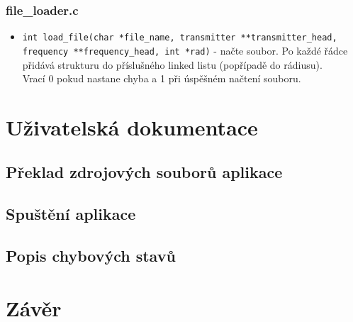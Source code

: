 \documentclass[12pt]{article}
\begin{document}
\subsubsection{file\_loader.c}
\begin{itemize}
	\item \texttt{int load\_file(char *file\_name,
		transmitter **transmitter\_head,
              frequency **frequency\_head, int *rad)} - načte soubor. Po každé
		řádce přidává strukturu do příslušného linked listu (popřípadě
		do rádiusu).\\

		Vrací 0 pokud nastane chyba a 1 při úspěšném načtení souboru.
\end{itemize}
%
%

\section{Uživatelská dokumentace}
\subsection{Překlad zdrojových souborů aplikace}
\subsection{Spuštění aplikace}
\newpage
\subsection{Popis chybových stavů}
%
%
\pagebreak
\section{Závěr}
\end{document}

